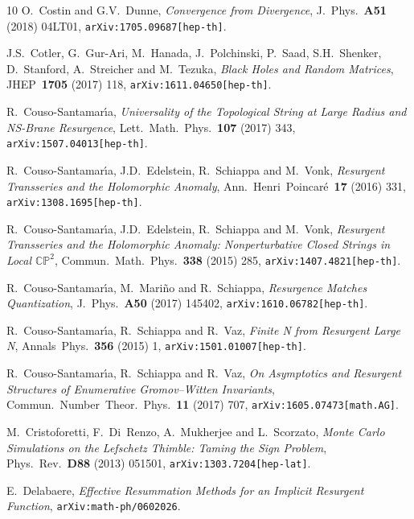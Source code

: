 \documentclass[11pt,a4paper]{article}
\def\BC{{\mathbb C}}
\def\BP{{\mathbb P}}
\begin{document}
\begin{thebibliography}{10}
O.~Costin and G.V.~Dunne,
\textit{Convergence from Divergence},
J.\ Phys.\ \textbf{A51} (2018) 04LT01,
\texttt{arXiv:1705.09687[hep-th]}.

J.S.~Cotler, G.~Gur-Ari, M.~Hanada, J.~Polchinski, P.~Saad, S.H.~Shenker, D.~Stanford, A.~Streicher and M.~Tezuka,
\textit{Black Holes and Random Matrices},
JHEP\ \textbf{1705} (2017) 118,
\texttt{arXiv:1611.04650[hep-th]}.

R.~Couso-Santamar\'\i a,
\textit{Universality of the Topological String at Large Radius and NS-Brane Resurgence},
Lett.\ Math.\ Phys.\ \textbf{107} (2017) 343,
\texttt{arXiv:1507.04013[hep-th]}.

R.~Couso-Santamar\'\i a, J.D.~Edelstein, R.~Schiappa and M.~Vonk,
\textit{Resurgent Transseries and the Holomorphic Anomaly},
Ann.\ Henri\ Poincar\'e\ \textbf{17} (2016) 331,
\texttt{arXiv:1308.1695[hep-th]}.

R.~Couso-Santamar\'\i a, J.D.~Edelstein, R.~Schiappa and M.~Vonk,
\textit{Resurgent Transseries and the Holomorphic Anomaly: Nonperturbative Closed Strings in Local $\BC\BP^2$},
Commun.\ Math.\ Phys.\ \textbf{338} (2015) 285,
\texttt{arXiv:1407.4821[hep-th]}.

R.~Couso-Santamar\'\i a, M.~Mari\~no and R.~Schiappa,
\textit{Resurgence Matches Quantization},
J.\ Phys.\ \textbf{A50} (2017) 145402,
\texttt{arXiv:1610.06782[hep-th]}.

R.~Couso-Santamar\'\i a, R.~Schiappa and R.~Vaz,
\textit{Finite N from Resurgent Large N},
Annals\ Phys.\ \textbf{356} (2015) 1,
\texttt{arXiv:1501.01007[hep-th]}.

R.~Couso-Santamar\'\i a, R.~Schiappa and R.~Vaz,
\textit{On Asymptotics and Resurgent Structures of Enumerative Gromov--Witten Invariants},
Commun.\ Number\ Theor.\ Phys.\ \textbf{11} (2017) 707,
\texttt{arXiv:1605.07473[math.AG]}.

M.~Cristoforetti, F.~Di~Renzo, A.~Mukherjee and L.~Scorzato,
\textit{Monte Carlo Simulations on the Lefschetz Thimble: Taming the Sign Problem},
Phys.\ Rev.\ \textbf{D88} (2013) 051501,
\texttt{arXiv:1303.7204[hep-lat]}.

E.~Delabaere,
\textit{Effective Resummation Methods for an Implicit Resurgent Function},
\texttt{arXiv:math-ph/0602026}.


\end{thebibliography}
\end{document}
